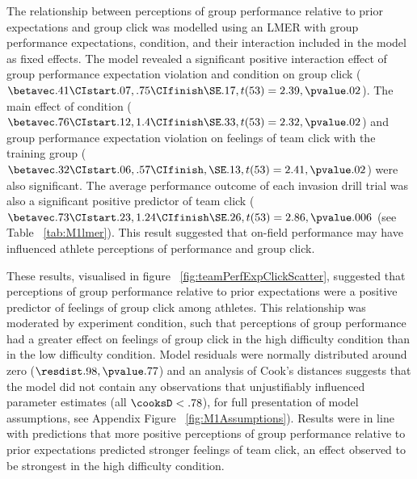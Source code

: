 The relationship between perceptions of group performance relative to prior expectations and group click was modelled using an LMER with group performance expectations, condition, and their interaction included in the model as fixed effects. The model revealed a significant positive interaction effect of group performance expectation violation and condition on group click ($\betavec .41 \CIstart .07, .75 \CIfinish \SE .17, t(53) = 2.39, \pvalue .02 $).  The main effect of condition ($\betavec .76 \CIstart .12, 1.4 \CIfinish \SE .33, t(53) = 2.32, \pvalue .02 $) and group performance expectation violation on feelings of team click with the training group ($\betavec .32 \CIstart .06, .57 \CIfinish, \SE .13, t(53)= 2.41, \pvalue .02$) were also significant.  The average performance outcome of each invasion drill trial was also a significant positive predictor of team click ($\betavec .73 \CIstart .23, 1.24 \CIfinish \SE .26, t(53)= 2.86, \pvalue .006$ (see Table ~\ref{tab:M1lmer}). This result suggested that on-field performance may have influenced athlete perceptions of performance and group click.

These results, visualised in figure ~\ref{fig:teamPerfExpClickScatter}, suggested that perceptions of group performance relative to prior expectations were a positive predictor of feelings of group click among athletes.  This relationship was moderated by experiment condition, such that perceptions of group performance had a greater effect on feelings of group click in the high difficulty condition than in the low difficulty condition.  Model residuals were normally distributed around zero ($\resdist .98, \pvalue .77 $) and an analysis of Cook's distances suggests that the model did not contain any observations that unjustifiably influenced parameter estimates (all $\cooksD < .78$), for full presentation of model assumptions, see Appendix Figure ~\ref{fig:M1Assumptions}).  Results were in line with predictions that more positive perceptions of group performance relative to prior expectations predicted stronger feelings of team click, an effect observed to be strongest in the high difficulty condition.




